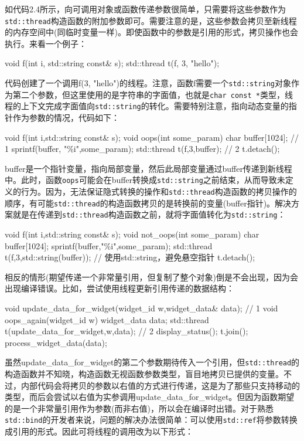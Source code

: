 
如代码2.4所示，向可调用对象或函数传递参数很简单，只需要将这些参数作为 \texttt{std::thread}构造函数的附加参数即可。需要注意的是，这些参数会拷贝至新线程的内存空间中(同临时变量一样)。即使函数中的参数是引用的形式，拷贝操作也会执行。来看一个例子：

\begin{cpp}
void f(int i, std::string const& s);
std::thread t(f, 3, "hello");
\end{cpp}

代码创建了一个调用f(3, "hello")的线程。注意，函数f需要一个\texttt{std::string}对象作为第二个参数，但这里使用的是字符串的字面值，也就是\texttt{char const *}类型，线程的上下文完成字面值向\texttt{std::string}的转化。需要特别注意，指向动态变量的指针作为参数的情况，代码如下：

\begin{cpp}
void f(int i,std::string const& s);
void oops(int some_param)
{
  char buffer[1024]; // 1
  sprintf(buffer, "\%i",some_param);
  std::thread t(f,3,buffer); // 2
  t.detach();
}
\end{cpp}

buffer是一个指针变量，指向局部变量，然后此局部变量通过buffer传递到新线程中。此时，函数\texttt{oops}可能会在buffer转换成\texttt{std::string}之前结束，从而导致未定义的行为。因为，无法保证隐式转换的操作和\texttt{std::thread}构造函数的拷贝操作的顺序，有可能\texttt{std::thread}的构造函数拷贝的是转换前的变量(buffer指针)。解决方案就是在传递到\texttt{std::thread}构造函数之前，就将字面值转化为\texttt{std::string}：

\begin{cpp}
void f(int i,std::string const& s);
void not_oops(int some_param)
{
  char buffer[1024];
  sprintf(buffer,"\%i",some_param);
  std::thread t(f,3,std::string(buffer));  // 使用std::string，避免悬空指针
  t.detach();
}
\end{cpp}

相反的情形(期望传递一个非常量引用，但复制了整个对象)倒是不会出现，因为会出现编译错误。比如，尝试使用线程更新引用传递的数据结构：

\begin{cpp}
void update_data_for_widget(widget_id w,widget_data& data); // 1
void oops_again(widget_id w)
{
  widget_data data;
  std::thread t(update_data_for_widget,w,data); // 2
  display_status();
  t.join();
  process_widget_data(data);
}
\end{cpp}

虽然update\_data\_for\_widget的第二个参数期待传入一个引用，但\texttt{std::thread}的构造函数并不知晓，构造函数无视函数参数类型，盲目地拷贝已提供的变量。不过，内部代码会将拷贝的参数以右值的方式进行传递，这是为了那些只支持移动的类型，而后会尝试以右值为实参调用update\_data\_for\_widget。但因为函数期望的是一个非常量引用作为参数(而非右值)，所以会在编译时出错。对于熟悉\texttt{std::bind}的开发者来说，问题的解决办法很简单：可以使用\texttt{std::ref}将参数转换成引用的形式。因此可将线程的调用改为以下形式：

